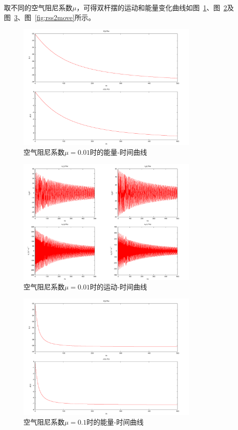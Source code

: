 \documentclass[a4paper,12pt,titlepage]{article}
\begin{document}
取不同的空气阻尼系数$\mu$，可得双杆摆的运动和能量变化曲线如图~\ref{fig:rss1E}、图~\ref{fig:rss1move}及图~\ref{fig:rss2E}、图~\ref{fig:rss2move}所示。
\begin{figure}[H]
\centering
\includegraphics[width=0.8\textwidth]{./rss1E.pdf}
\caption[Caption for LOF]{空气阻尼系数$\mu=0.01$时的能量-时间曲线}
\label{fig:rss1E}
\end{figure}
\begin{figure}[H]
\centering
\includegraphics[width=0.8\textwidth]{./rss1move.pdf}
\caption[Caption for LOF]{空气阻尼系数$\mu=0.01$时的运动-时间曲线}
\label{fig:rss1move}
\end{figure}
\begin{figure}[H]
\centering
\includegraphics[width=0.8\textwidth]{./rss2E.pdf}
\caption[Caption for LOF]{空气阻尼系数$\mu=0.1$时的能量-时间曲线}
\label{fig:rss2E}
\end{figure}
\end{document}
